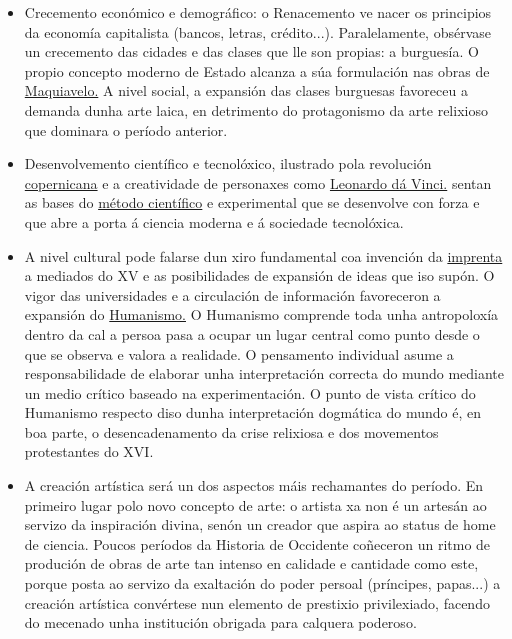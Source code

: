 \documentclass[
]{article}
\begin{document}
\begin{itemize}
\item
  Crecemento económico e demográfico: o Renacemento ve nacer os
  principios da economía capitalista (bancos, letras, crédito...).
  Paralelamente, obsérvase un crecemento das cidades e das clases que
  lle son propias: a burguesía. O propio concepto moderno de Estado
  alcanza a súa formulación nas obras de
  \href{http://es.wikipedia.org/wiki/Maquiavelo}{Maquiavelo.} A nivel
  social, a expansión das clases burguesas favoreceu a demanda dunha
  arte laica, en detrimento do protagonismo da arte relixioso que
  dominara o período anterior.
\item
  Desenvolvemento científico e tecnolóxico, ilustrado pola revolución
  \href{http://es.wikipedia.org/wiki/Cop\%C3\%A9rnico}{copernicana} e a
  creatividade de personaxes como
  \href{http://es.wikipedia.org/wiki/Leonardo_da_Vinci}{Leonardo dá
  Vinci.} sentan as bases do
  \href{http://es.wikipedia.org/wiki/M\%C3\%A9todo_cient\%C3\%ADfico}{método
  científico} e experimental que se desenvolve con forza e que abre a
  porta á ciencia moderna e á sociedade tecnolóxica.
\item
  A nivel cultural pode falarse dun xiro fundamental coa invención da
  \href{http://es.wikipedia.org/wiki/Imprenta}{imprenta} a mediados do
  XV e as posibilidades de expansión de ideas que iso supón. O vigor das
  universidades e a circulación de información favoreceron a expansión
  do \href{http://es.wikipedia.org/wiki/Humanismo}{Humanismo.} O
  Humanismo comprende toda unha antropoloxía dentro da cal a persoa pasa
  a ocupar un lugar central como punto desde o que se observa e valora a
  realidade. O pensamento individual asume a responsabilidade de
  elaborar unha interpretación correcta do mundo mediante un medio
  crítico baseado na experimentación. O punto de vista crítico do
  Humanismo respecto diso dunha interpretación dogmática do mundo é, en
  boa parte, o desencadenamento da crise relixiosa e dos movementos
  protestantes do XVI.
\item
  A creación artística será un dos aspectos máis rechamantes do período.
  En primeiro lugar polo novo concepto de arte: o artista xa non é un
  artesán ao servizo da inspiración divina, senón un creador que aspira
  ao status de home de ciencia. Poucos períodos da Historia de Occidente
  coñeceron un ritmo de produción de obras de arte tan intenso en
  calidade e cantidade como este, porque posta ao servizo da exaltación
  do poder persoal (príncipes, papas...) a creación artística convértese
  nun elemento de prestixio privilexiado, facendo do mecenado unha
  institución obrigada para calquera poderoso.
\end{itemize}
\end{document}
